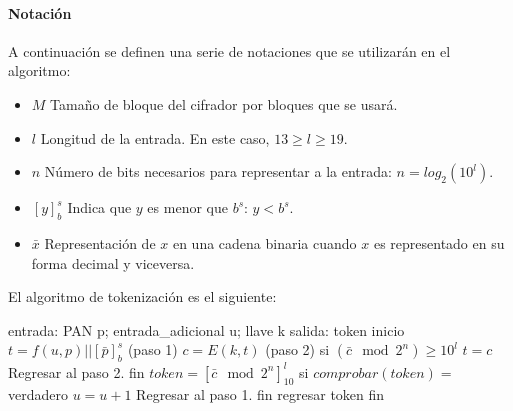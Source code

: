 \paragraph{Notación}
A continuación se definen una serie de notaciones que se utilizarán en el
algoritmo:
\begin{itemize}
  \item $ M $ Tamaño de bloque del cifrador por bloques que se usará.
  \item $ l $ Longitud de la entrada. En este caso, $13 \geq l \geq 19$.
  \item $ n $ Número de bits necesarios para representar a la entrada:
    $n = log_2(10^l)$.
  \item $ [y]^s_b $ Indica que $y$ es menor que $b^s$: $y < b^s$.
  \item $\bar{x}$ Representación de $x$ en una cadena binaria cuando $x$ es
    representado en su forma decimal y viceversa.
\end{itemize}


El algoritmo de tokenización es el siguiente:
\begin{pseudocodigo}[%
    caption={Híbrido reversible, método de tokenización}
  ]
  entrada: PAN p; entrada_adicional u; llave k
  salida:  token
  inicio
    $t = f(u, p) || [\bar{p}]^s_b$ (paso 1)
    $c = E(k, t)$ (paso 2)
    si $(\bar{c} \mod 2^n) \geq 10^l$
      $t = c$
      Regresar al paso 2.
    fin
    $token = {[\bar{c} \mod 2^n]}^l_{10}$
    si $comprobar(token) =$ verdadero
      $u = u + 1$
      Regresar al paso 1.
    fin
    regresar token
  fin
\end{pseudocodigo}
